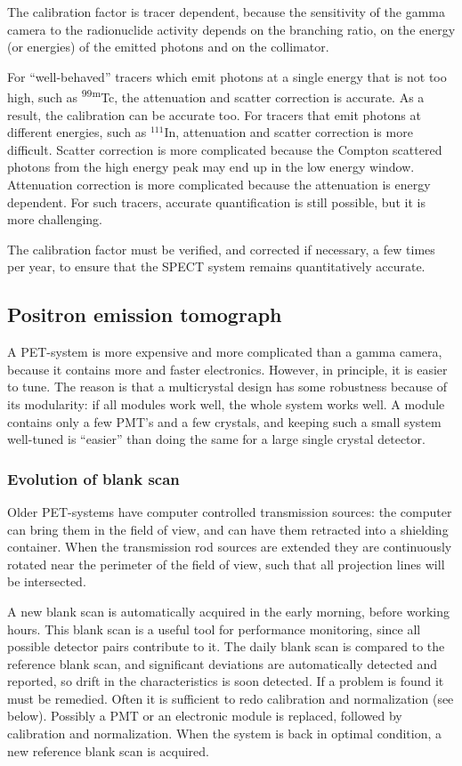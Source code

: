 \documentclass[11pt,oneside]{article}
\begin{document}
The calibration factor is tracer dependent, because the sensitivity of
the gamma camera to the radionuclide activity depends on the branching
ratio, on the energy (or energies) of the emitted photons and on the
collimator.

For ``well-behaved'' tracers which emit photons at a single energy
that is not too high, such as \textsuperscript{99m}Tc, the attenuation and scatter
correction is accurate. As a result, the calibration can be accurate
too. For tracers that emit photons at different energies, such as
$^{111}$In, attenuation and scatter correction is more
difficult. Scatter correction is more complicated because the Compton
scattered photons from the high energy peak may end up in the low
energy window. Attenuation correction is more complicated because the
attenuation is energy dependent. For such tracers, accurate
quantification is still possible, but it is more challenging.

The calibration factor must be verified, and corrected if necessary, a
few times per year, to ensure that the SPECT system remains
quantitatively accurate.

\subsection{Positron emission tomograph}
A PET-system is more expensive and more complicated than a gamma camera,
because it contains more and faster electronics. However, in principle,
it is easier to tune. The reason is that a multicrystal design has some
robustness because of its modularity: if all modules work well, the whole
system works well. A module contains only a few PMT's and a few crystals, and
keeping such a small system well-tuned is ``easier'' than doing the same for a
large single crystal detector.

\subsubsection{Evolution of blank scan}
Older PET-systems have computer controlled transmission sources: the
computer can bring them in the field of view, and can have them
retracted into a shielding container. When the transmission rod
sources are extended they are continuously rotated near the perimeter
of the field of view, such that all projection lines will be
intersected.

A new blank scan is automatically acquired in the early morning,
before working hours. This blank scan is a useful tool for performance
monitoring, since all possible detector pairs contribute to it.  The
daily blank scan is compared to the reference blank scan, and
significant deviations are automatically detected and reported, so
drift in the characteristics is soon detected. If a problem is found
it must be remedied. Often it is sufficient to redo calibration and
normalization (see below). Possibly a PMT or an electronic module is
replaced, followed by calibration and normalization. When the system
is back in optimal condition, a new reference blank scan is acquired.
\end{document}
